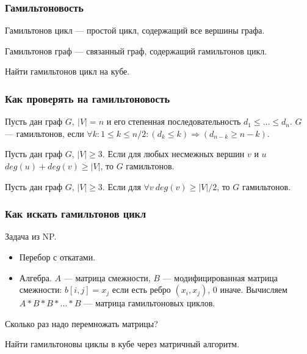 \documentclass[xcolor=table]{beamer}
\begin{document}
\begin{frame} \frametitle{Гамильтоновость}
  
\begin{definition}
Гамильтонов цикл --- простой цикл, содержащий все вершины графа.
\end{definition}


\begin{definition}
Гамильтонов граф --- связанный граф, содержащий гамильтонов цикл.
\end{definition}

Найти гамильтонов цикл на кубе.

\end{frame}


\begin{frame} \frametitle{Как проверять на гамильтоновость}
  
\begin{theorem}[Хватала]
Пусть дан граф $G, \ |V| = n$ и его степенная последовательность $d_1 \leq \ldots \leq d_n$. $G$ --- гамильтонов, если $\forall k: 1 \leq k \leq n/2 : (d_k \leq k) \Rightarrow (d_{n-k} \geq n-k)$.
\end{theorem}
\pause

\begin{theorem}[Оре]
Пусть дан граф $G$, $|V|\geq 3$. Если для любых несмежных вершин $v$ и $u$ $deg(u) + deg(v) \geq |V|$, то $G$ гамильтонов.
\end{theorem}
\pause

\begin{theorem}[Дирака]
Пусть дан граф $G$, $|V|\geq 3$. Если для $\forall v \ deg(v) \geq |V|/2$, то $G$ гамильтонов.
\end{theorem}


\end{frame}


\begin{frame} \frametitle{Как искать гамильтонов цикл}

Задача из NP.
  
\begin{itemize}
\item Перебор с откатами.
\pause
\item Алгебра. $A$ --- матрица смежности, $B$ --- модифицированная матрица смежности: $b[i,j] = x_j$ если есть ребро $(x_i,x_j)$, 0 иначе.
Вычисляем $A*B*B*\ldots *B$ --- матрица гамильтоновых циклов.
\end{itemize}

Сколько раз надо перемножать матрицы?

Найти гамильтоновы циклы в кубе через матричный алгоритм.



\end{frame}
\end{document}
